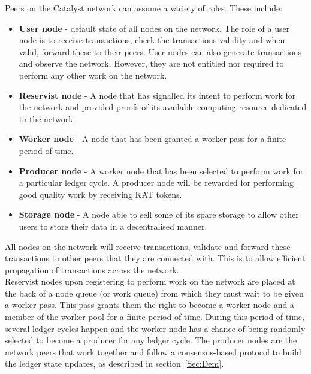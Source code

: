 Peers on the Catalyst network can assume a variety of roles. These include:

\begin{itemize}

\item \textbf{User node} - default state of all nodes on the network. The role of a user node is to receive transactions, check the transactions validity and when valid, forward these to their peers. User nodes can also generate transactions and observe the network. However, they are not entitled nor required to perform any other work on the network. 

\item \textbf{Reservist node} - A node that has signalled its intent to perform work for the network and provided proofs of its available computing resource dedicated to the network.

\item \textbf{Worker node} - A node that has been granted a worker pass for a finite period of time. 

\item \textbf{Producer node} - A worker node that has been selected to perform work for a particular ledger cycle. A producer node will be rewarded for performing good quality work by receiving KAT tokens. 

\item \textbf{Storage node} - A node able to sell some of its spare storage to allow other users to store their data in a decentralised manner. 

\end{itemize}

All nodes on the network will receive transactions, validate and forward these transactions to other peers that they are connected with. This is to allow efficient propagation of transactions across the network. \\

Reservist nodes upon registering to perform work on the network are placed at the back of a node queue (or work queue) from which they must wait to be given a worker pass. This pass grants them the right to become a worker node and a member of the worker pool for a finite period of time. During this period of time, several ledger cycles happen and the worker node has a chance of being randomly selected to become a producer for any ledger cycle. The producer nodes are the network peers that work together and follow a consensus-based protocol to build the ledger state updates, as described in section~\ref{Sec:Dem}. 